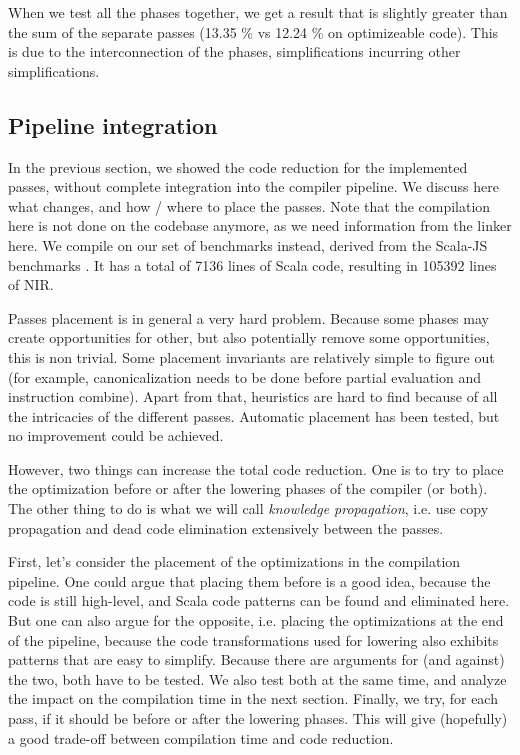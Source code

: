 \documentclass[11pt,a4paper]{article}
\newcommand{\perf}[1]{#1 \%}
\begin{document}
When we test all the phases together, we get a result that is slightly greater than the sum of the separate passes (\perf{13.35} vs \perf{12.24} on optimizeable code). This is due to the interconnection of the phases, simplifications incurring other simplifications.


\subsection{Pipeline integration}

In the previous section, we showed the code reduction for the implemented passes, without complete integration into the compiler pipeline. We discuss here what changes, and how / where to place the passes. Note that the compilation here is not done on the codebase anymore, as we need information from the linker here. We compile on our set of benchmarks instead, derived from the Scala-JS benchmarks \cite{scalajsbench}. It has a total of 7136 lines of Scala code, resulting in 105392 lines of NIR.

Passes placement is in general a very hard problem. Because some phases may create opportunities for other, but also potentially remove some opportunities, this is non trivial. Some placement invariants are relatively simple to figure out (for example, canonicalization needs to be done before partial evaluation and instruction combine). Apart from that, heuristics are hard to find because of all the intricacies of the different passes. Automatic placement has been tested, but no improvement could be achieved.

However, two things can increase the total code reduction. One is to try to place the optimization before or after the lowering phases of the compiler (or both). The other thing to do is what we will call \textit{knowledge propagation}, i.e. use copy propagation and dead code elimination extensively between the passes.

First, let's consider the placement of the optimizations in the compilation pipeline. One could argue that placing them before is a good idea, because the code is still high-level, and Scala code patterns can be found and eliminated here. But one can also argue for the opposite, i.e. placing the optimizations at the end of the pipeline, because the code transformations used for lowering also exhibits patterns that are easy to simplify. Because there are arguments for (and against) the two, both have to be tested. We also test both at the same time, and analyze the impact on the compilation time in the next section. Finally, we try, for each pass, if it should be before or after the lowering phases. This will give (hopefully) a good trade-off between compilation time and code reduction.
\end{document}
